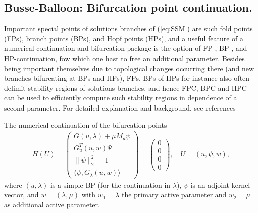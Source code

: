 \documentclass[a4paper,12pt]{article}
\begin{document}
\subsection{Busse-Balloon: Bifurcation point continuation.}\label{sec:BBs}

Important special points of solutions branches of (\ref{eq:SSM}) are such fold points (FPs), branch points (BPs), and Hopf points (HPs), and a useful feature of a numerical continuation and bifurcation package is the option of FP-, BP-, and HP-continuation, fow which one hast to free an additional parameter. Besides being important themselves due to topological changes occurring there (and new branches bifurcating at BPs and HPs), FPs, BPs of HPs for instance also often delimit stability regions of solutions branches, and hence FPC, BPC and HPC can be used to efficiently compute such stability regions in dependence of a second parameter. For detailed explanation and background, see references \cite{uecker2021numerical,uecker2023continuation}

The numerical continuation of the bifurcation points 
\begin{align}
    H(U) = \begin{pmatrix}
        G(u,\lambda) + \mu M_d \psi\\
        G^T_u(u,w)\Psi\\
        \parallel\psi\parallel_2^2 - 1\\
        \langle \psi,G_\lambda(u,w)\rangle 
    \end{pmatrix} = \begin{pmatrix}
        0\\0\\0\\0
    \end{pmatrix},\quad U =(u,\psi,w),
\end{align}
where $(u,\lambda)$ is a simple BP (for the continuation in $\lambda$), $\psi$ is an adjoint kernel vector, and $w=(\lambda,\mu)$ with $w_1=\lambda$ the primary active parameter and $w_2 = \mu$ as additional active parameter.
\end{document}
